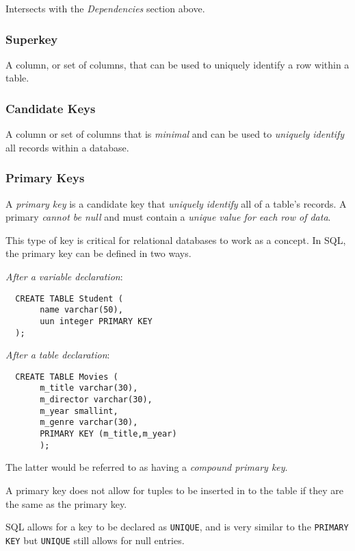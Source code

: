 \documentclass{article}
\begin{document}
Intersects with the \textit{Dependencies} section above.

\subsubsection{Superkey}

A column, or set of columns, that can be used to uniquely identify a row within a table.

\subsubsection{Candidate Keys}

A column or set of columns that is \textit{minimal} and can be used to \textit{uniquely identify} all records within a database.

\subsubsection{Primary Keys}

A \textit{primary key} is a candidate key that \textit{uniquely identify} all of a table's records. A primary \textit{cannot be null} and must contain a \textit{unique value for each row of data}.

This type of key is critical for relational databases to work as a concept. In SQL, the primary key can be defined in two ways.

\textit{After a variable declaration}:

\begin{lstlisting}
  CREATE TABLE Student (
       name varchar(50),
       uun integer PRIMARY KEY
  );
\end{lstlisting}

\textit{After a table declaration}:

\begin{lstlisting}
  CREATE TABLE Movies (
       m_title varchar(30),
       m_director varchar(30),
       m_year smallint,
       m_genre varchar(30),
       PRIMARY KEY (m_title,m_year)
       );
\end{lstlisting}

The latter would be referred to as having a \textit{compound primary key}.

A primary key does not allow for tuples to be inserted in to the table if they are the same as the primary key.

SQL allows for a key to be declared as \texttt{UNIQUE}, and is very similar to the \texttt{PRIMARY KEY} but \texttt{UNIQUE} still allows for null entries.
\end{document}
